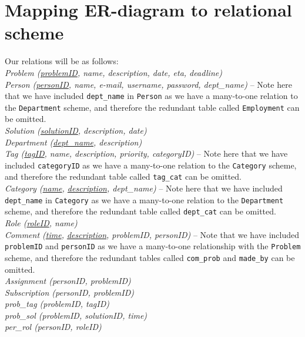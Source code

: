 \section{Mapping ER-diagram to relational scheme}
\label{sec:map_er_rel}

Our relations will be as follows:\\

\noindent\textit{Problem (\underline{problemID}, name, description, date, eta, deadline)} \\

\noindent\textit{Person (\underline{personID}, name, e-mail, username, password, dept\_name)}  -- Note here that we have included \verb+dept_name+ in \verb+Person+ as we have a many-to-one relation to the \verb+Department+ scheme, and therefore the redundant table called \verb+Employment+ can be omitted.\\

\noindent\textit{Solution (\underline{solutionID}, description, date)} \\

\noindent\textit{Department (\underline{dept\_name}, description)} \\

\noindent\textit{Tag (\underline{tagID}, name, description, priority, categoryID)} -- Note here that we have included \verb+categoryID+ as we have a many-to-one relation to the \verb+Category+ scheme, and therefore the redundant table called \verb+tag_cat+ can be omitted.\\

\noindent\textit{Category (\underline{name}, \underline{description}, dept\_name)} -- Note here that we have included \verb+dept_name+ in \verb+Category+ as we have a many-to-one relation to the \verb+Department+ scheme, and therefore the redundant table called \verb+dept_cat+ can be omitted.\\

\noindent\textit{Role (\underline{roleID}, name)} \\

\noindent\textit{Comment (\underline{time}, \underline{description}, problemID, personID)} -- Note that we have included \verb+problemID+ and \verb+personID+ as we have a many-to-one relationship with the \verb+Problem+ scheme, and therefore the redundant tables called \verb+com_prob+ and \verb+made_by+ can be omitted.\\

\noindent\textit{Assignment (personID, problemID)} \\

\noindent\textit{Subscription (personID, problemID)} \\

\noindent\textit{prob\_tag (problemID, tagID)} \\

\noindent\textit{prob\_sol (problemID, solutionID, time)} \\

\noindent\textit{per\_rol (personID, roleID)} \\